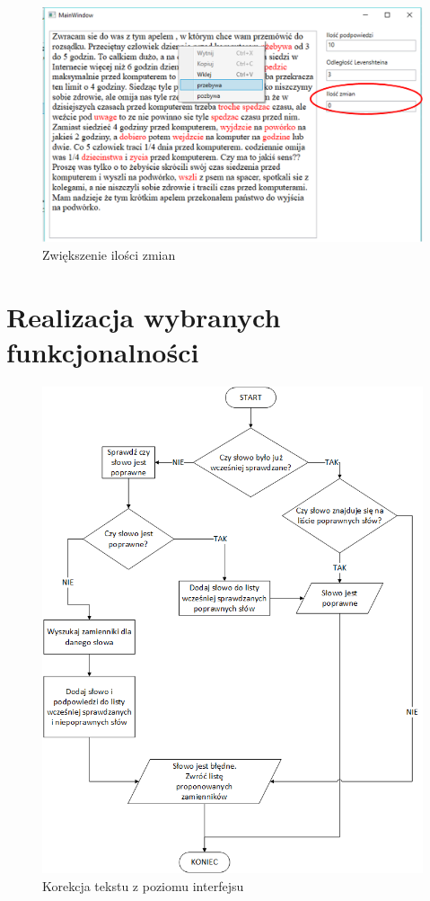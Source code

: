 \begin{figure} [H]
	\centering
	\includegraphics[width=1\linewidth]{rozdzial03/screen6_1.png}
	\caption{Zwiększenie ilości zmian}
	\label{fig:interfejs5}
\end{figure}

\section{Realizacja wybranych funkcjonalności}

\begin{figure} [H]
	\centering
	\includegraphics[width=1\linewidth]{rozdzial03/CorectorManager.png}
	\caption{Korekcja tekstu z poziomu interfejsu}
	\label{fig:CorectorManager}
\end{figure}
